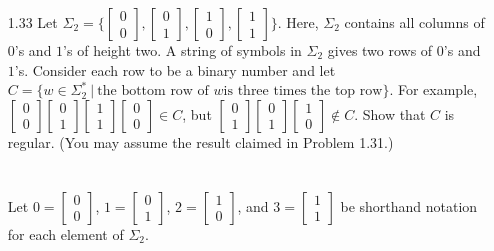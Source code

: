 \begin{enumerate}
    \item [1.33]
          Let $\Sigma_2 = \Biggl \{ \begin{bmatrix}0 \\0\end{bmatrix} , \begin{bmatrix}0 \\1\end{bmatrix} , \begin{bmatrix}1\\ 0\end{bmatrix}, \begin{bmatrix}1 \\1\end{bmatrix} \Biggl\}$. Here, $\Sigma_2$ contains all columns of $0$'s and $1$'s of height two. A string of symbols in $\Sigma_2$ gives two rows of $0$'s and $1$'s. Consider each row to be a binary number and let $C =\{w \in \Sigma^\ast_2~|~\text{the bottom row of }w \text{is three times the top row}\}$. For example, $\begin{bmatrix}0 \\0 \end{bmatrix}\begin{bmatrix}0\\ 1 \end{bmatrix}\begin{bmatrix}1 \\1 \end{bmatrix}\begin{bmatrix}0 \\0\end{bmatrix} \in C$, but $\begin{bmatrix}0 \\1\end{bmatrix} \begin{bmatrix}0\\ 1\end{bmatrix} \begin{bmatrix}1\\ 0\end{bmatrix} \notin C$. Show that $C$ is regular. (You may assume the result claimed in Problem 1.31.)
          \\
          \\
          \\
          Let $0 = \begin{bmatrix}0 \\ 0\end{bmatrix}$, $1 = \begin{bmatrix}0 \\ 1\end{bmatrix}$, $2 = \begin{bmatrix}1 \\ 0\end{bmatrix}$, and $3 = \begin{bmatrix}1 \\ 1\end{bmatrix}$ be shorthand notation for each element of $\Sigma_2$.


\end{enumerate}
